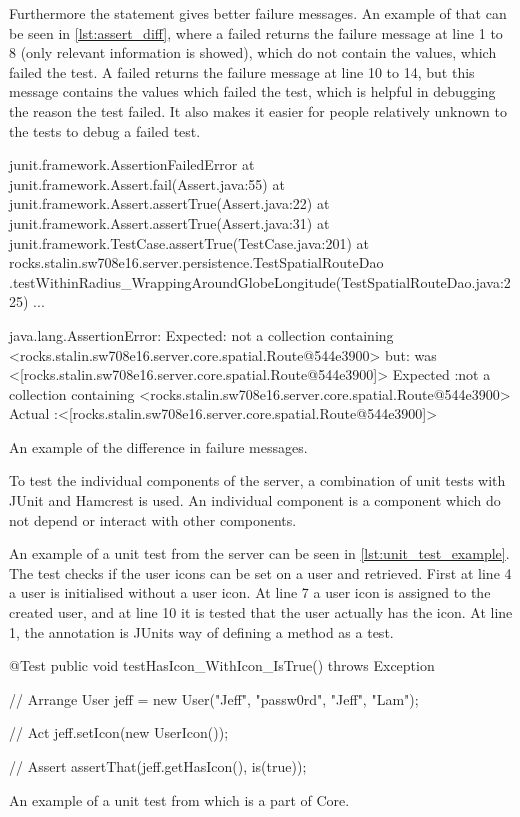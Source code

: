 Furthermore the  statement gives better failure messages\cite{hamcrest_vs_junit}.
An example of that can be seen in \cref{lst:assert_diff},
where a failed  returns the failure message at line 1 to 8 (only relevant information is showed),
which do not contain the values, which failed the test.
A failed  returns the failure message at line 10 to 14,
but this message contains the values which failed the test,
which is helpful in debugging the reason the test failed.
It also makes it easier for people relatively unknown to the tests to debug a failed test.

\begin{listing}
    \begin{java2}
    junit.framework.AssertionFailedError
        at junit.framework.Assert.fail(Assert.java:55)
        at junit.framework.Assert.assertTrue(Assert.java:22)
        at junit.framework.Assert.assertTrue(Assert.java:31)
        at junit.framework.TestCase.assertTrue(TestCase.java:201)
        at rocks.stalin.sw708e16.server.persistence.TestSpatialRouteDao
            .testWithinRadius_WrappingAroundGlobeLongitude(TestSpatialRouteDao.java:225)
        ...

    java.lang.AssertionError:
    Expected: not a collection containing <rocks.stalin.sw708e16.server.core.spatial.Route@544e3900>
    but: was <[rocks.stalin.sw708e16.server.core.spatial.Route@544e3900]>
    Expected :not a collection containing <rocks.stalin.sw708e16.server.core.spatial.Route@544e3900>
    Actual   :<[rocks.stalin.sw708e16.server.core.spatial.Route@544e3900]>
    \end{java2}
    \caption{An example of the difference in failure messages.}
    \label{lst:assert_diff}
\end{listing}

To test the individual components of the server,
a combination of unit tests with JUnit and Hamcrest is used.
An individual component is a component which do not depend or interact with other components.

An example of a unit test from the server can be seen in \cref{lst:unit_test_example}.
The test checks if the user icons can be set on a user and retrieved.
First at line 4 a user is initialised without a user icon.
At line 7 a user icon is assigned to the created user,
and at line 10 it is tested that the user actually has the icon.
At line 1, the annotation  is JUnits way of defining a method as a test.

\begin{listing}
    \begin{java2}
        @Test
        public void testHasIcon_WithIcon_IsTrue() throws Exception {
            // Arrange
            User jeff = new User("Jeff", "passw0rd", "Jeff", "Lam");

            // Act
            jeff.setIcon(new UserIcon());

            // Assert
            assertThat(jeff.getHasIcon(), is(true));
        }
    \end{java2}
    \caption{An example of a unit test from  which is a part of Core.}
    \label{lst:unit_test_example}
\end{listing}

